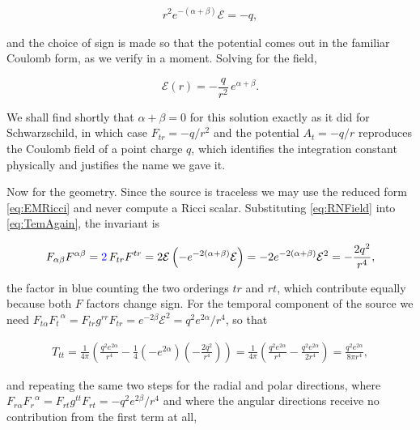         \begin{align*}
            r^2e^{-(\alpha+\beta)}\mathcal{E} = -q,
        \end{align*}

        and the choice of sign is made so that the potential comes out in the familiar Coulomb form, as we verify in a moment. Solving for the field,

        \begin{equation}\label{eq:RNField}
            \mathcal{E}(r) = -\frac{q}{r^2}\,e^{\alpha+\beta}.
        \end{equation}

        We shall find shortly that $\alpha+\beta=0$ for this solution exactly as it did for Schwarzschild, in which case $F_{tr}=-q/r^2$ and the potential $A_{t}=-q/r$ reproduces the Coulomb field of a point charge $q$, which identifies the integration constant physically and justifies the name we gave it.

        Now for the geometry. Since the source is traceless we may use the reduced form \ref{eq:EMRicci} and never compute a Ricci scalar. Substituting \ref{eq:RNField} into \ref{eq:TemAgain}, the invariant is

        \begin{align*}
            F_{\alpha\beta}F^{\alpha\beta} = {\color{blue}2}\,F_{tr}F^{tr} = 2\mathcal{E}\left(-e^{-2(\alpha+\beta)}\mathcal{E}\right) = -2e^{-2(\alpha+\beta)}\mathcal{E}^2 = -\frac{2q^2}{r^4},
        \end{align*}

        the factor in blue counting the two orderings $tr$ and $rt$, which contribute equally because both $F$ factors change sign. For the temporal component of the source we need $F_{t\alpha}F_{t}^{\;\;\alpha} = F_{tr}g^{rr}F_{tr} = e^{-2\beta}\mathcal{E}^2 = q^2e^{2\alpha}/r^4$, so that

        \begin{align*}
            T_{tt} = \frac{1}{4\pi}\left(\frac{q^2e^{2\alpha}}{r^4} - \frac{1}{4}\left(-e^{2\alpha}\right)\left(-\frac{2q^2}{r^4}\right)\right) = \frac{1}{4\pi}\left(\frac{q^2e^{2\alpha}}{r^4} - \frac{q^2e^{2\alpha}}{2r^4}\right) = \frac{q^2e^{2\alpha}}{8\pi r^4},
        \end{align*}

        and repeating the same two steps for the radial and polar directions, where $F_{r\alpha}F_{r}^{\;\;\alpha} = F_{rt}g^{tt}F_{rt} = -q^2e^{2\beta}/r^4$ and where the angular directions receive no contribution from the first term at all,

